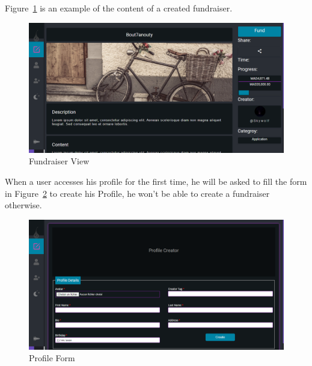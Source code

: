 Figure~\ref{fig:fundraiser view} is an example of the content of a created fundraiser.
\begin{figure}[H]
      \centering
      \includegraphics[scale=0.45]{assets/screen-fundraiser-view.png}
      \caption{Fundraiser View}
      \label{fig:fundraiser view}
\end{figure}



When a user accesses his profile for the first time, he will be asked to fill the form in Figure~\ref{fig:profile form} 
to create his Profile, he won't be able to create a fundraiser otherwise.

\begin{figure}[H]
      \centering
      \includegraphics[scale=0.45]{assets/screen-profile-creator.png}
      \caption{Profile Form}
      \label{fig:profile form}
\end{figure}

